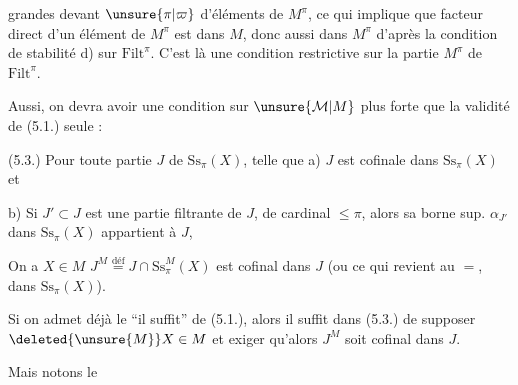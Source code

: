 
grandes devant $\unsure{\pi|\varpi}$ d'éléments de $M^\pi$, ce qui
implique que  facteur direct d'un
élément de $M^\pi$ est dans $M$, donc aussi
dans $M^\pi$ d'après la condition de stabilité
d) sur $\mathrm{Filt}^{\pi}$. C'est là une condition
restrictive sur la partie $M^\pi$ de $\mathrm{Filt}^{\pi}$.

Aussi, on devra avoir une condition
sur $\unsure{\mathcal M|M}$ plus forte que la validité de
(5.1.) seule :

(5.3.) Pour  toute partie $J$ de $\mathrm{Ss}_\pi(X)$, telle
que a) $J$ est cofinale dans $\mathrm{Ss}_\pi(X)$ et

b) Si  $J'\subset J$ est une partie filtrante
de $J$, de cardinal $\leq\pi$, alors sa borne
sup. $\alpha_{J'}$ dans $\mathrm{Ss}_\pi(X)$ appartient à $J$,

On a $X\in M$  $J^M\overset{\mathrm{déf}}{=}J\cap\mathrm{Ss}^{M}_\pi(X)$
est cofinal dans $J$ (ou ce qui revient
au $=$, dans $\mathrm{Ss}_\pi(X)$).

 Si on admet déjà  le ``il suffit'' de
(5.1.), alors il suffit dans (5.3.) de
supposer $\deleted{\unsure{M}}X\in M$ et exiger qu'alors
$J^M$ soit cofinal dans $J$.

Mais notons le

